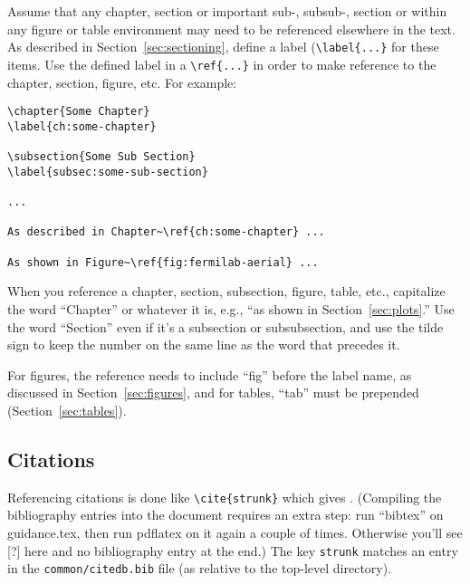 Assume that any chapter, section or important sub-, subsub-, section
or within any figure or table environment may need to be referenced
elsewhere in the text. As described in Section~\ref{sec:sectioning},
define a label (\verb|\label{...}| for these items.
Use the defined label in a \verb|\ref{...}| in order to make reference
to the chapter, section, figure, etc.
For example:

\begin{verbatim}
\chapter{Some Chapter}
\label{ch:some-chapter}

\subsection{Some Sub Section}
\label{subsec:some-sub-section}

...

As described in Chapter~\ref{ch:some-chapter} ...

As shown in Figure~\ref{fig:fermilab-aerial} ...
\end{verbatim}

When you reference a chapter, section, subsection, figure, table,
etc., capitalize the word ``Chapter'' or whatever it is, e.g., ``as
shown in Section~\ref{sec:plots}.''
Use the word ``Section'' even if it's a subsection or subsubsection,
and use the tilde sign to keep the number on the same line as the word
that precedes it.

For figures, the reference needs to include ``fig'' before the label name, as discussed in Section~\ref{sec:figures}, and for tables, ``tab'' must be prepended (Section~\ref{sec:tables}).


\subsection{Citations}

Referencing citations is done like \verb|\cite{strunk}| which gives \cite{strunk}.
(Compiling the bibliography entries into the document requires an extra step: run ``bibtex'' on
 guidance.tex, then run pdflatex on it again a couple of times. Otherwise you'll see [?] here 
 and no bibliography entry at the end.) 
The key \texttt{strunk} matches an entry in the \texttt{common/citedb.bib}
file (as relative to the top-level directory).


